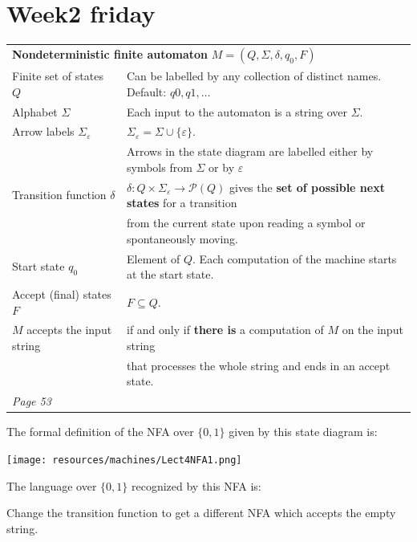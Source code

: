 \documentclass[12pt, oneside]{article}
\begin{document}
\vspace{100pt}
 \vfill
\section*{Week2 friday}



\begin{center}
\begin{tabular}{|ll|}
\hline
\multicolumn{2}{|l|}{{\bf Nondeterministic finite automaton} $M = (Q, \Sigma, \delta, q_0, F)$} \\
Finite set of states $Q$  & Can  be labelled by any collection  of distinct names. Default: $q0, q1, \ldots$  \\
Alphabet $\Sigma$ &  Each input to the automaton is a string over  $\Sigma$. \\
Arrow labels $\Sigma_\varepsilon$ &  $\Sigma_\varepsilon = \Sigma \cup \{ \varepsilon\}$. \\
&  Arrows 
in the state diagram are labelled either by symbols from $\Sigma$ or by $\varepsilon$ \\
Transition function $\delta$  & $\delta: Q \times \Sigma_{\varepsilon} \to \mathcal{P}(Q)$
gives the {\bf set of possible next states} for a transition \\
&  from the current state upon reading a symbol or spontaneously moving.\\
Start state $q_0$ & Element of $Q$.  Each computation of the machine starts at the  start  state.\\
Accept (final) states $F$ & $F \subseteq  Q$.\\
$M$ accepts the input string & if and only if {\bf there is} a computation of $M$ on the input string\\
&  that 
processes the whole string and ends in an
accept state.\\
\hline
{\it Page 53}& \\
\hline
\end{tabular}
\end{center}

The formal definition of the NFA over $\{0,1\}$ given by this state diagram is: 

\texttt{[image: resources/machines/Lect4NFA1.png]}

The language over $\{0,1\}$ recognized by this NFA is:

\vspace{70pt}

Change the transition function to get a different NFA which accepts
the empty string.
\end{document}
